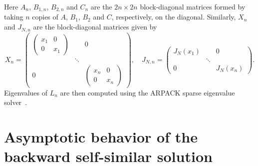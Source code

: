 \documentclass[11pt]{article}
\begin{document}
Here \(A_{n}\), \(B_{1,n}\), \(B_{2,n}\) and \(C_{n}\) are the
\(2n \times 2n\) block-diagonal matrices formed by taking \(n\) copies
of \(A\), \(B_{1}\), \(B_{2}\) and \(C\), respectively, on the
diagonal. Similarly, \(X_{n}\) and \(J_{N,n}\) are the block-diagonal
matrices given by
\begin{equation*}
  X_{n} =
  \begin{pmatrix}
    \left(\begin{smallmatrix} x_{1} & 0 \\ 0 & x_{1} \end{smallmatrix}\right) & & 0 \\
    & \ddots & \\
    0 & & \left(\begin{smallmatrix} x_{n} & 0 \\ 0 & x_{n} \end{smallmatrix}\right)
  \end{pmatrix},\quad
  J_{N,n} =
  \begin{pmatrix}
    J_{N}(x_{1}) & & 0 \\
    & \ddots & \\
    0 & & J_{N}(x_{n})
  \end{pmatrix}.
\end{equation*}
Eigenvalues of \(L_{n}\) are then computed using the ARPACK sparse
eigenvalue solver~\cite{Lehoucq1998}.

\section{Asymptotic behavior of the backward self-similar solution}
\label{sec:improvements-backward}
\end{document}
